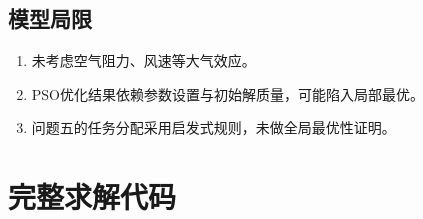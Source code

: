 \documentclass[12pt,a4paper]{article}
\begin{document}
\subsection{模型局限}
\begin{enumerate}[nosep]
  \item 未考虑空气阻力、风速等大气效应。
  \item PSO优化结果依赖参数设置与初始解质量，可能陷入局部最优。
  \item 问题五的任务分配采用启发式规则，未做全局最优性证明。
\end{enumerate}


\appendix
\section{完整求解代码}
\end{document}
